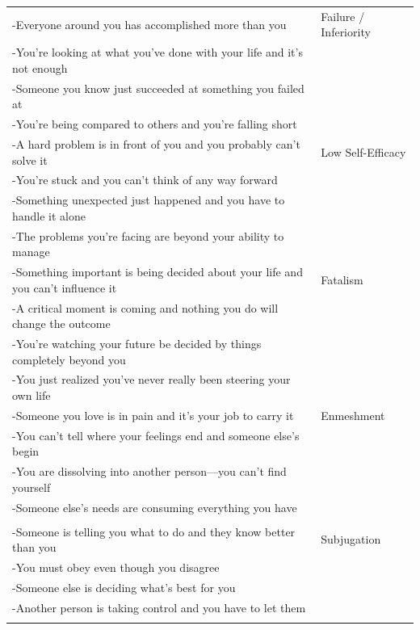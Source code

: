 \documentclass[11pt,oneside]{book}
\begin{document}
\begin{longtable}{>{\raggedright}p{} p{}}
-Everyone around you has accomplished more than you & Failure / Inferiority \\
-You're looking at what you've done with your life and it's not enough &  \\
-Someone you know just succeeded at something you failed at &  \\
-You're being compared to others and you're falling short &  \\
\addlinespace

-A hard problem is in front of you and you probably can't solve it & Low Self-Efficacy \\
-You're stuck and you can't think of any way forward &  \\
-Something unexpected just happened and you have to handle it alone &  \\
-The problems you're facing are beyond your ability to manage &  \\
\addlinespace

-Something important is being decided about your life and you can't influence it & Fatalism \\
-A critical moment is coming and nothing you do will change the outcome &  \\
-You're watching your future be decided by things completely beyond you &  \\
-You just realized you've never really been steering your own life &  \\
\addlinespace

-Someone you love is in pain and it's your job to carry it & Enmeshment \\
-You can't tell where your feelings end and someone else's begin &  \\
-You are dissolving into another person---you can't find yourself &  \\
-Someone else's needs are consuming everything you have &  \\

\midrule
\multicolumn{2}{l}{\textbf{Freedom to Express Needs, Opinions \& Emotions}} \\
\midrule

-Someone is telling you what to do and they know better than you & Subjugation \\
-You must obey even though you disagree &  \\
-Someone else is deciding what's best for you &  \\
-Another person is taking control and you have to let them &  \\
\addlinespace


\end{longtable}
\end{document}
